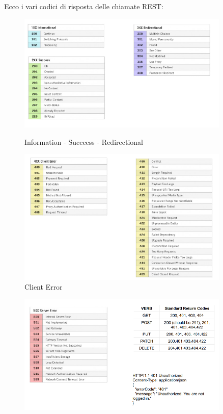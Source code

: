 \documentclass{article}
\begin{document}
		Ecco i vari codici di risposta delle chiamate REST:
		\begin{figure}[ht]
		\centering
		    \begin{minipage}{0.5\textwidth}
		        \centering
		        \includegraphics[width=0.9\textwidth]{SAC_09.png} %
		        \caption{Information - Succcess - Redirectional}
		    \end{minipage}\hfill
		    \begin{minipage}{0.5\textwidth}
		        \centering
		        \includegraphics[width=0.9\textwidth]{SAC_10.png} %
		        \caption{Client Error}
		    \end{minipage}
		\end{figure}
		
		\begin{figure}[ht]
		    \centering
		    \includegraphics[width=0.9\textwidth]{SAC_11.png}
		\end{figure}
		
\end{document}
